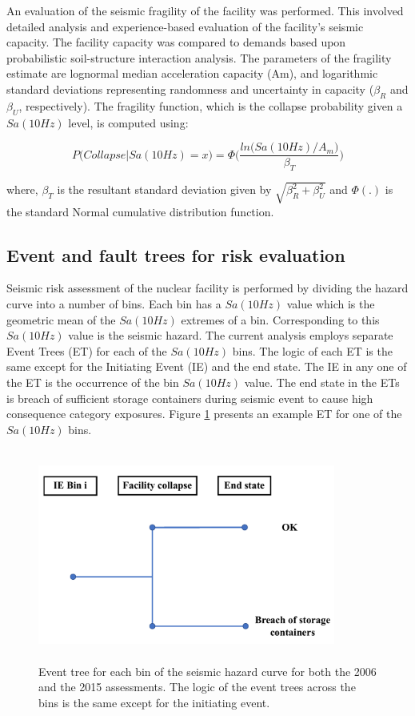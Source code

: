 \documentclass[3p]{elsarticle}
\begin{document}
An evaluation of the seismic fragility of the facility was performed. This involved detailed analysis and experience-based evaluation of the facility’s seismic capacity. The facility capacity was compared to demands based upon probabilistic soil-structure interaction analysis. The parameters of the fragility estimate are lognormal median acceleration capacity (Am), and logarithmic standard deviations representing randomness and uncertainty in capacity ($\beta_R$ and $\beta_U$, respectively). The fragility function, which is the collapse probability given a $Sa(10Hz)$ level, is computed using:

\begin{equation}
\label{eq2}
P\big(Collapse|Sa(10Hz) = x\big) = \Phi \Big(\frac{ln\big(Sa(10Hz)/A_m\big)}{\beta_T}\Big)
\end{equation}

\noindent where, $\beta_T$ is the resultant standard deviation given by $\sqrt{\beta_R^2 + \beta_U^2}$ and $\Phi(.)$ is the standard Normal cumulative distribution function.

\subsection{Event and fault trees for risk evaluation}

Seismic risk assessment of the nuclear facility is performed by dividing the hazard curve into a number of bins. Each bin has a $Sa(10Hz)$ value which is the geometric mean of the $Sa(10Hz)$ extremes of a bin. Corresponding to this $Sa(10Hz)$ value is the seismic hazard. The current analysis employs separate Event Trees (ET) for each of the $Sa(10Hz)$ bins. The logic of each ET is the same except for the Initiating Event (IE) and the end state. The IE in any one of the ET is the occurrence of the bin $Sa(10Hz)$ value. The end state in the ETs is breach of sufficient storage containers during seismic event to cause high consequence category exposures. Figure \ref{fig:ET} presents an example ET for one of the $Sa(10Hz)$ bins.

\begin{figure}[h]
\centering
\includegraphics[width=3.85in, height = 2.75in]{ET.pdf}
\caption{Event tree for each bin of the seismic hazard curve for both the 2006 and the 2015 assessments. The logic of the event trees across the bins is the same except for the initiating event.}\label{fig:ET}
\end{figure}
\end{document}
